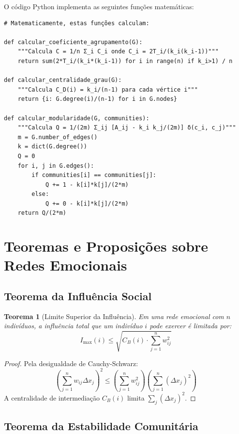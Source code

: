 \documentclass[12pt, a4paper]{article}
\newtheorem{theorem}{Teorema}
\begin{document}
O código Python implementa as seguintes funções matemáticas:

\begin{lstlisting}[caption={Implementação Matemática das Métricas}, label=lst:metrics]
# Matematicamente, estas funções calculam:

def calcular_coeficiente_agrupamento(G):
    """Calcula C = 1/n Σ_i C_i onde C_i = 2T_i/(k_i(k_i-1))"""
    return sum(2*T_i/(k_i*(k_i-1)) for i in range(n) if k_i>1) / n

def calcular_centralidade_grau(G):
    """Calcula C_D(i) = k_i/(n-1) para cada vértice i"""
    return {i: G.degree(i)/(n-1) for i in G.nodes}

def calcular_modularidade(G, communities):
    """Calcula Q = 1/(2m) Σ_ij [A_ij - k_i k_j/(2m)] δ(c_i, c_j)"""
    m = G.number_of_edges()
    k = dict(G.degree())
    Q = 0
    for i, j in G.edges():
        if communities[i] == communities[j]:
            Q += 1 - k[i]*k[j]/(2*m)
        else:
            Q += 0 - k[i]*k[j]/(2*m)
    return Q/(2*m)
\end{lstlisting}

\section{Teoremas e Proposições sobre Redes Emocionais}

\subsection{Teorema da Influência Social}

\begin{theorem}[Limite Superior da Influência]
Em uma rede emocional com $n$ indivíduos, a influência total que um indivíduo $i$ pode exercer é limitada por:
\[
I_{\max}(i) \leq \sqrt{C_B(i) \cdot \sum_{j=1}^n w_{ij}^2}
\]
\end{theorem}

\begin{proof}
Pela desigualdade de Cauchy-Schwarz:
\[
\left(\sum_{j=1}^n w_{ij} \Delta x_j\right)^2 \leq \left(\sum_{j=1}^n w_{ij}^2\right) \left(\sum_{j=1}^n (\Delta x_j)^2\right)
\]
A centralidade de intermediação $C_B(i)$ limita $\sum_j (\Delta x_j)^2$.
\end{proof}

\subsection{Teorema da Estabilidade Comunitária}
\end{document}
